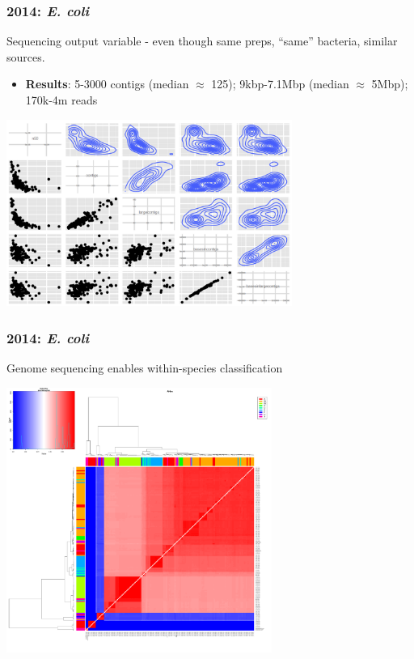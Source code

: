 \begin{frame}
  \frametitle{2014: \textit{E. coli}}
  Sequencing output variable - even though same preps, ``same'' bacteria, similar sources.
  \begin{itemize}
    \item \textbf{Results}: 5-3000 contigs (median $\approx$ 125); 9kbp-7.1Mbp (median $\approx$ 5Mbp); 170k-4m reads
  \end{itemize}  
  \begin{center}
    \includegraphics[width=0.7\textwidth]{images/ecoli_sequencing_variation}
  \end{center}      
\end{frame}

\begin{frame}
  \frametitle{2014: \textit{E. coli}}
  Genome sequencing enables within-species classification
  \begin{center}
    \includegraphics[width=0.65\textwidth]{images/ANIm_Ecoli}
  \end{center}      
\end{frame}


